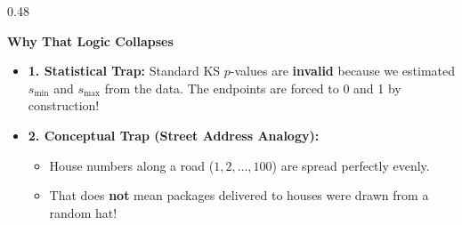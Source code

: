 \documentclass[aspectratio=169,10pt]{beamer}
\begin{document}
\begin{frame}[c]
\begin{columns}[t,onlytextwidth]
\begin{column}{0.48\textwidth}
{\begin{minipage}{\dimexpr\linewidth-2\fboxsep-2\fboxrule\relax}
          \vspace{0.08cm}
          {\small \textbf{\color{accentred} Why That Logic Collapses}}\\[0.08cm]
          {\scriptsize
          \begin{itemize}
            \setlength{\itemsep}{0.08cm}
            \item \textbf{1. Statistical Trap:} Standard KS $p$-values are \textbf{invalid} because we estimated $s_{\min}$ and $s_{\max}$ from the data. The endpoints are forced to 0 and 1 by construction!
            \item \textbf{2. Conceptual Trap (Street Address Analogy):}
            \begin{itemize}
              \setlength{\itemsep}{0.04cm}
              \item House numbers along a road ($1, 2, \dots, 100$) are spread perfectly evenly.
              \item That does \textbf{not} mean packages delivered to houses were drawn from a random hat!
            \end{itemize}
          \end{itemize}}
          \vspace{0.08cm}
        \end{minipage}
      }
    \end{column}
  \end{columns}
  
  \vspace{0.22cm}
  \begin{center}
    \setlength{\fboxrule}{1pt}
  \end{center}
\end{frame}
\end{document}
